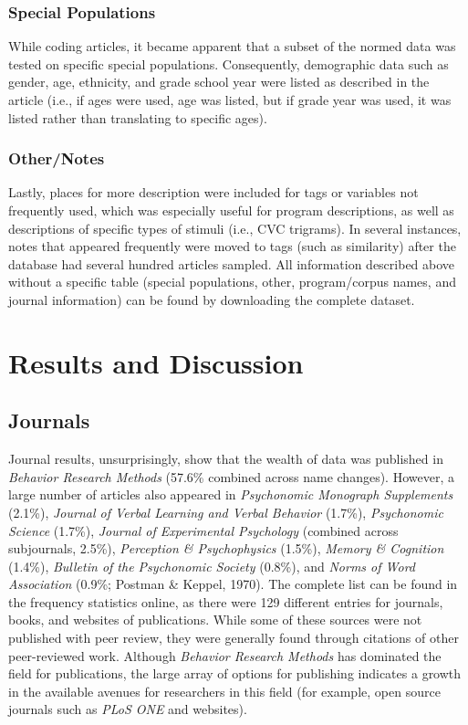 \documentclass[english,,man]{apa6}
\theoremstyle{definition}
\theoremstyle{definition}
\theoremstyle{definition}
\theoremstyle{remark}
\begin{document}
\hypertarget{special-populations}{%
\subsubsection{Special Populations}\label{special-populations}}

While coding articles, it became apparent that a subset of the normed
data was tested on specific special populations. Consequently,
demographic data such as gender, age, ethnicity, and grade school year
were listed as described in the article (i.e., if ages were used, age
was listed, but if grade year was used, it was listed rather than
translating to specific ages).

\hypertarget{othernotes}{%
\subsubsection{Other/Notes}\label{othernotes}}

Lastly, places for more description were included for tags or variables
not frequently used, which was especially useful for program
descriptions, as well as descriptions of specific types of stimuli
(i.e., CVC trigrams). In several instances, notes that appeared
frequently were moved to tags (such as similarity) after the database
had several hundred articles sampled. All information described above
without a specific table (special populations, other, program/corpus
names, and journal information) can be found by downloading the complete
dataset.

\hypertarget{results-and-discussion}{%
\section{Results and Discussion}\label{results-and-discussion}}

\hypertarget{journals}{%
\subsection{Journals}\label{journals}}

Journal results, unsurprisingly, show that the wealth of data was
published in \emph{Behavior Research Methods} (57.6\% combined across
name changes). However, a large number of articles also appeared in
\emph{Psychonomic Monograph Supplements} (2.1\%), \emph{Journal of
Verbal Learning and Verbal Behavior} (1.7\%), \emph{Psychonomic Science}
(1.7\%), \emph{Journal of Experimental Psychology} (combined across
subjournals, 2.5\%), \emph{Perception \& Psychophysics} (1.5\%),
\emph{Memory \& Cognition} (1.4\%), \emph{Bulletin of the Psychonomic
Society} (0.8\%), and \emph{Norms of Word Association} (0.9\%; Postman
\& Keppel, 1970). The complete list can be found in the frequency
statistics online, as there were 129 different entries for journals,
books, and websites of publications. While some of these sources were
not published with peer review, they were generally found through
citations of other peer-reviewed work. Although \emph{Behavior Research
Methods} has dominated the field for publications, the large array of
options for publishing indicates a growth in the available avenues for
researchers in this field (for example, open source journals such as
\emph{PLoS ONE} and websites).
\end{document}
